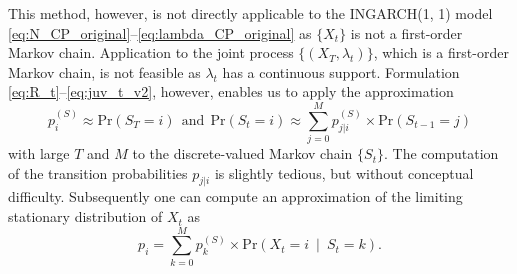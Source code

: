 \documentclass{article}
\begin{document}
This method, however, is not directly applicable to the INGARCH(1, 1) model \eqref{eq:N_CP_original}--\eqref{eq:lambda_CP_original} as $\{X_t\}$ is not a first-order Markov chain. Application to the joint process $\{(X_T, \lambda_t)\}$, which is a first-order Markov chain, is not feasible as $\lambda_t$ has a continuous support. Formulation \eqref{eq:R_t}--\eqref{eq:juv_t_v2}, however, enables us to apply the approximation
$$
p^{(S)}_i \approx \text{Pr}(S_T = i) \ \ \text{and} \ \ \text{Pr}(S_t = i) \approx \sum_{j = 0}^M p^{(S)}_{j|i} \times \text{Pr}(S_{t - 1} = j)
$$
with large $T$ and $M$ to the discrete-valued Markov chain $\{S_t\}$. The computation of the transition probabilities $p_{j|i}$ is slightly tedious, but without conceptual difficulty. Subsequently one can compute an approximation of the limiting stationary distribution of $X_t$ as
$$
p_i = \sum_{k = 0}^M p_k^{(S)} \times \text{Pr}(X_t = i \ \mid \ S_t = k).
$$





\end{document}
